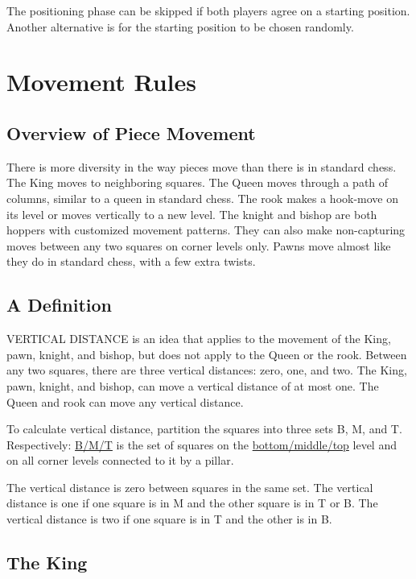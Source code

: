 \documentclass[12pt]{article} %
\begin{document}
The positioning phase can be skipped if both players agree on a starting position.  Another alternative is for the starting position to be chosen randomly.  

\section{Movement Rules}

\subsection{Overview of Piece Movement}

There is more diversity in the way pieces move than there is in standard chess.  The King moves to neighboring squares.  The Queen moves through a path of columns, similar to a queen in standard chess.  The rook makes a hook-move on its level or moves vertically to a new level.  The knight and bishop are both hoppers with customized movement patterns. They can also make non-capturing moves between any two squares on corner levels only.  Pawns move almost like they do in standard chess, with a few extra twists.

\subsection{A Definition}

VERTICAL DISTANCE is an idea that applies to the movement of the King, pawn, knight, and bishop, but does not apply to the Queen or the rook.  Between any two squares, there are three vertical distances: zero, one, and two.  The King, pawn, knight, and bishop, can move a vertical distance of at most one.  The Queen and rook can move any vertical distance.

To calculate vertical distance, partition the squares into three sets B, M, and T.  
Respectively: \underline{B/M/T} is the set of squares on the \underline{bottom/middle/top} level and on all corner levels connected to it by a pillar.

The vertical distance is zero between squares in the same set.  
The vertical distance is one if one square is in M and the other square is in T or B.  
The vertical distance is two if one square is in T and the other is in B.  

\subsection{The King}
\end{document}
